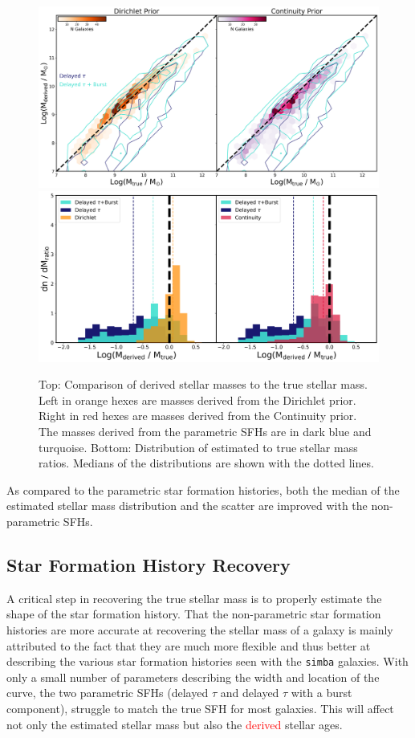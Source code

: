 \documentclass[twocolumn]{aastex62}
\newcommand{\red}[1]{{\textcolor{red}{#1}}}
\begin{document}
\begin{figure}[h]
    \centering
    \includegraphics[width=\textwidth]{mass_comp.png}\hfill
    \includegraphics[width=\textwidth]{ratio_hist_ultra.png}\hfill
    
    \caption{Top: Comparison of derived stellar masses to the true stellar mass. Left in orange hexes are masses derived from the Dirichlet prior. Right in red hexes are masses derived from the Continuity prior. The masses derived from the parametric SFHs are in dark blue and turquoise. Bottom: Distribution of estimated to true stellar mass ratios. Medians of the distributions are shown with the dotted lines.}
    \label{fig:mass_comp}
\end{figure}

As compared to the parametric star formation histories, both the median of the estimated stellar mass distribution and the scatter are improved with the non-parametric SFHs. 

\subsection{Star Formation History Recovery}

A critical step in recovering the true stellar mass is to properly estimate the shape of the star formation history. That the non-parametric star formation histories are more accurate at recovering the stellar mass of a galaxy is mainly attributed to the fact that they are much more flexible and thus better at describing the various star formation histories seen with the \texttt{simba} galaxies. With only a small number of parameters describing the width and location of the curve, the two parametric SFHs (delayed $\tau$ and delayed $\tau$ with a burst component), struggle to match the true SFH for most galaxies. This will affect not only the estimated stellar mass but also the \red{derived} stellar ages. 
\end{document}

